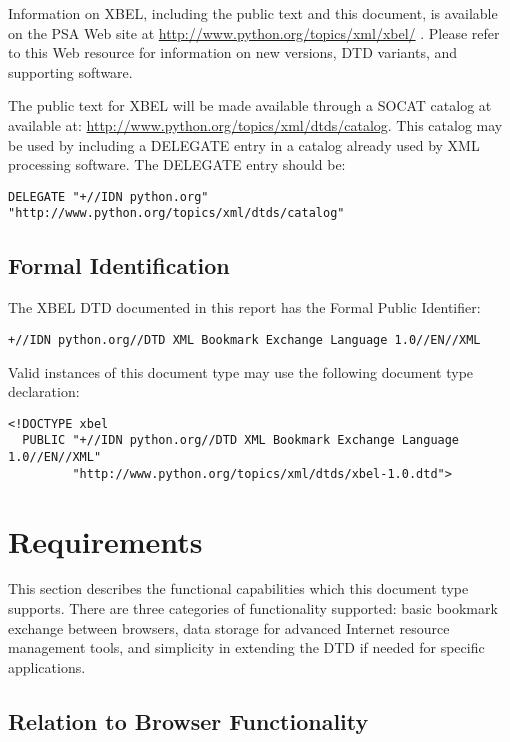 \documentclass{howto}
\begin{document}
    Information on XBEL, including the public text and this document,
    is available on the PSA Web site at
    \url{http://www.python.org/topics/xml/xbel/} \cite{xbel-home}.
    Please refer to this Web resource for information on new versions,
    DTD variants, and supporting software.

    The public text for XBEL will be made available through a SOCAT
    catalog at available at:
    \url{http://www.python.org/topics/xml/dtds/catalog}.  This catalog
    may be used by including a DELEGATE entry in a catalog already
    used by XML processing software.  The DELEGATE entry should be:

\begin{verbatim}
DELEGATE "+//IDN python.org" "http://www.python.org/topics/xml/dtds/catalog"
\end{verbatim}


  \subsection{Formal Identification
              \label{formal-ident}}

    The XBEL DTD documented in this report has the Formal Public
    Identifier:

\begin{verbatim}
+//IDN python.org//DTD XML Bookmark Exchange Language 1.0//EN//XML
\end{verbatim}

    Valid instances of this document type may use the following document
    type declaration:

\begin{verbatim}
<!DOCTYPE xbel
  PUBLIC "+//IDN python.org//DTD XML Bookmark Exchange Language 1.0//EN//XML"
         "http://www.python.org/topics/xml/dtds/xbel-1.0.dtd">
\end{verbatim}


\section{Requirements
         \label{requirements}}

  This section describes the functional capabilities which this
  document type supports.  There are three categories of
  functionality supported:  basic bookmark exchange between browsers,
  data storage for advanced Internet resource management tools, and
  simplicity in extending the DTD if needed for specific
  applications.

  \subsection{Relation to Browser Functionality
              \label{req-browser}}
\end{document}
